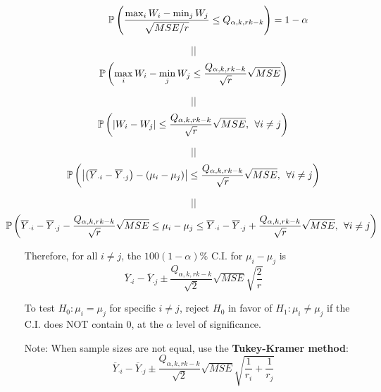 \begin{frame}[fragile]

	\begin{enumerate}
		\item[]
	\[
		\hspace{3em}		\mathbb{P} \left( \frac{\max_{i}W_i - \min_j W_j}{\sqrt{MSE/r}} \le Q_{\alpha,k,rk-k}  \right ) = 1-\alpha
	\]
		\item[]
	\[||\]
	\[
		\mathbb{P} \left(\max_i W_i -\min_j W_j \le \frac{Q_{\alpha,k,rk-k}}{\sqrt{r}}\sqrt{MSE}\right)
	\]
		\item[]
	\[||\]
	\[
		\mathbb{P} \left(\left| W_i -W_j\right| \le \frac{Q_{\alpha,k,rk-k}}{\sqrt{r}}\sqrt{MSE},\:\:\forall i\ne j\right)
	\]
		\item[]
	\[||\]
	\[
		\mathbb{P} \left(\left| \left(\overline{Y}_{\cdot i} -\overline{Y}_{\cdot j}\right) - (\mu_i-\mu_j)\right| \le \frac{Q_{\alpha,k,rk-k}}{\sqrt{r}}\sqrt{MSE},\:\:\forall i\ne j\right)
	\]
		\item[]
	\[||\]
	\[
		\hspace{-2em}		\bbP \left(
			\overline{Y}_{\cdot i} -\overline{Y}_{\cdot j} - \frac{Q_{\alpha,k,rk-k}}{\sqrt{r}}\sqrt{MSE}
		\le \mu_i-\mu_j \le
			\overline{Y}_{\cdot i} -\overline{Y}_{\cdot j}+ \frac{Q_{\alpha,k,rk-k}}{\sqrt{r}}\sqrt{MSE}
		,\:\: \forall i\ne j\right )
	\]
	\end{enumerate}
\end{frame}
\begin{frame}[fragile]

	\begin{enumerate}
		\item[] Therefore, for all $i\ne j$,
			the $100(1-\alpha)\%$ C.I. for $ \mu_i-\mu_j $ is \\[2em]
			\[
			\overline{Y}_{\cdot i} -\overline{Y}_{\cdot j} \pm  \frac{Q_{\alpha,k,rk-k}}{\sqrt{2}}\sqrt{MSE}\sqrt{\frac 2r}
			\]
			\vfill
		\item[] To test $H_0: \mu_i=\mu_j$ for specific $i\ne j$, reject $H_0$ in favor of $H_1:\mu_i\ne\mu_j$ if the C.I. does NOT contain $0$, at the $\alpha$ level of significance.\myEnd
			\vfill
		\item[Note:] When sample sizes are not equal, use the {\bf Tukey-Kramer method}: \\[2em]
			\[
				\overline{Y}_{\cdot i} -\overline{Y}_{\cdot j} \pm  \frac{Q_{\alpha,k,rk-k}}{\sqrt{2}}\sqrt{MSE}\sqrt{\frac{1}{r_i} + \frac{1}{r_j}}
			\]
	\end{enumerate}
\end{frame}
